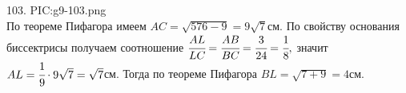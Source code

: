 103. {{PIC:g9-103.png}}\\
По теореме Пифагора имеем $AC=\sqrt{576-9}=9\sqrt{7}$см. По свойству основания биссектрисы получаем соотношение $\cfrac{AL}{LC}=\cfrac{AB}{BC}=\cfrac{3}{24}=\cfrac{1}{8},$ значит $AL=\cfrac{1}{9}\cdot9\sqrt{7}=\sqrt{7}$см. Тогда  по теореме Пифагора $BL=\sqrt{7+9}=4$см.\\

